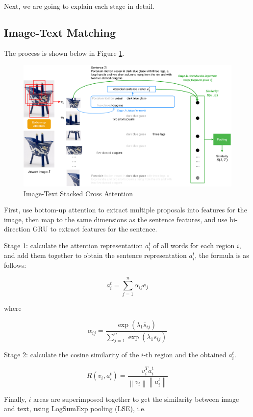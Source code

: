 Next, we are going to explain each stage in detail.

\subsection{Image-Text Matching}

The process is shown below in Figure \ref{fig:scan1}.

\begin{figure}[h!]
\centering
\includegraphics[width=\textwidth]{scan1.pdf}
\caption{Image-Text Stacked Cross Attention}
\label{fig:scan1}
\end{figure}

First, use bottom-up attention \cite{bottomup} to extract multiple proposals into features for the image, then map to the same dimensions as the sentence features, and use bi-direction GRU to extract features for the sentence.

Stage 1: calculate the attention representation $a_{i}^{t}$ of all words for each region $i$, and add them together to obtain the sentence representation $a_{i}^{t}$, the formula is as follows:

$$
a_{i}^{t}=\sum_{j=1}^{n} \alpha_{i j} e_{j}
$$

where

$$
\alpha_{i j}=\frac{\exp \left(\lambda_{1} \bar{s}_{i j}\right)}{\sum_{j=1}^{n} \exp \left(\lambda_{1} \bar{s}_{i j}\right)}
$$

Stage 2: calculate the cosine similarity of the $i$-th region and the obtained $a_{i}^{t}$.

$$
R\left(v_{i}, a_{i}^{t}\right)=\frac{v_{i}^{T} a_{i}^{t}}{\left\|v_{i}\right\|\left\|a_{i}^{t}\right\|}
$$

Finally, $i$ areas are superimposed together to get the similarity between image and text, using LogSumExp pooling (LSE), i.e.

